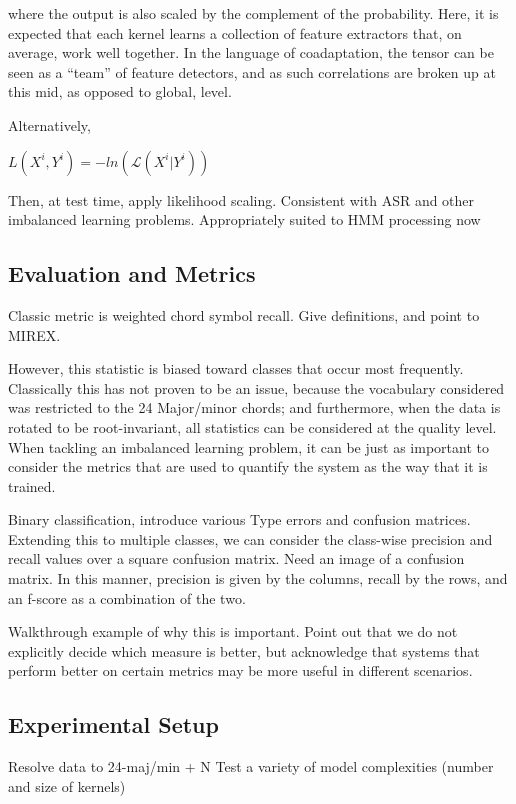 \noindent where the output is also scaled by the complement of the probability.
Here, it is expected that each kernel learns a collection of feature extractors that, on average, work well together.
In the language of coadaptation, the tensor can be seen as a ``team'' of feature detectors, and as such correlations are broken up at this mid, as opposed to global, level.

Alternatively,


$L(X^i, Y^i) = -ln(\mathcal{L}(X^i|Y^i))$

Then, at test time, apply likelihood scaling.
Consistent with ASR and other imbalanced learning problems.
Appropriately suited to HMM processing now



\subsection{Evaluation and Metrics}
Classic metric is weighted chord symbol recall.
Give definitions, and point to MIREX.

However, this statistic is biased toward classes that occur most frequently.
Classically this has not proven to be an issue, because the vocabulary considered was restricted to the 24 Major/minor chords; and furthermore, when the data is rotated to be root-invariant, all statistics can be considered at the quality level.
When tackling an imbalanced learning problem, it can be just as important to consider the metrics that are used to quantify the system as the way that it is trained.

Binary classification, introduce various Type errors and confusion matrices.
Extending this to multiple classes, we can consider the class-wise precision and recall values over a square confusion matrix.
Need an image of a confusion matrix.
In this manner, precision is given by the columns, recall by the rows, and an f-score as a combination of the two.

Walkthrough example of why this is important.
Point out that we do not explicitly decide which measure is better, but acknowledge that systems that perform better on certain metrics may be more useful in different scenarios.


\subsection{Experimental Setup}

Resolve data to 24-maj/min + N
Test a variety of model complexities (number and size of kernels)





